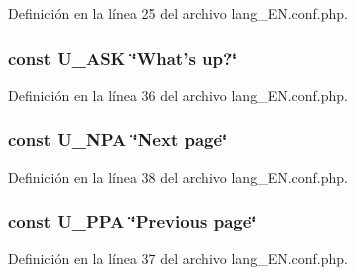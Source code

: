 Definición en la línea 25 del archivo lang\-\_\-\-E\-N.\-conf.\-php.

\hypertarget{lang__EN_8conf_8php_aade6029224a1af2dbad53ec0d454186f}{
\subsubsection[{U\-\_\-\-A\-S\-K}]{\setlength{\rightskip}{0pt plus 5cm}const U\-\_\-\-A\-S\-K \char`\"{}What's up?\char`\"{}}}\label{lang__EN_8conf_8php_aade6029224a1af2dbad53ec0d454186f}


Definición en la línea 36 del archivo lang\-\_\-\-E\-N.\-conf.\-php.

\hypertarget{lang__EN_8conf_8php_a1a03538e3e8586eb7532f569d9c62a75}{
\subsubsection[{U\-\_\-\-N\-P\-A}]{\setlength{\rightskip}{0pt plus 5cm}const U\-\_\-\-N\-P\-A \char`\"{}Next page\char`\"{}}}\label{lang__EN_8conf_8php_a1a03538e3e8586eb7532f569d9c62a75}


Definición en la línea 38 del archivo lang\-\_\-\-E\-N.\-conf.\-php.

\hypertarget{lang__EN_8conf_8php_a8980fc01853b6478780875fe230eb9d2}{
\subsubsection[{U\-\_\-\-P\-P\-A}]{\setlength{\rightskip}{0pt plus 5cm}const U\-\_\-\-P\-P\-A \char`\"{}Previous page\char`\"{}}}\label{lang__EN_8conf_8php_a8980fc01853b6478780875fe230eb9d2}


Definición en la línea 37 del archivo lang\-\_\-\-E\-N.\-conf.\-php.

